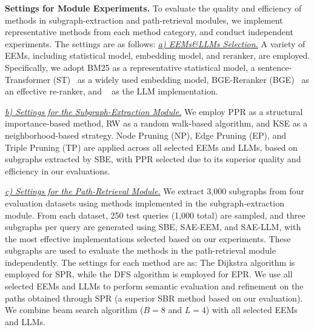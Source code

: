 \textbf{Settings for Module Experiments.}
To evaluate the quality and efficiency of methods in subgraph-extraction and path-retrieval modules, we implement representative methods from each method category, and conduct independent experiments. The settings are as follows:
{\it \underline{a) EEMs\&LLMs Selection.}} A variety of EEMs, including statistical model, embedding model, and reranker, are employed. Specifically, we adopt BM25 as a representative statistical model, a sentence-Transformer (ST)~\cite{MiniLM} as a widely used embedding model, BGE-Reranker (BGE)~\cite{BGE} as an effective re-ranker, and ~\cite{qwen2} as the LLM implementation.

{\it \underline{b) Settings for the Subgraph-Extraction Module.}}
 We employ PPR as a structural importance-based method, RW as a random walk-based algorithm, and KSE as a neighborhood-based strategy.
 Node Pruning (NP), Edge Pruning (EP), and Triple Pruning (TP) are applied across all selected EEMs and LLMs, based on subgraphs extracted by SBE, with PPR selected due to its superior quality and efficiency in our evaluations.

{\it \underline{c) Settings for the Path-Retrieval Module.}}
We extract 3,000 subgraphs from four evaluation datasets using methods implemented in the subgraph-extraction module. From each dataset, 250 test queries (1,000 total) are sampled, and three subgraphs per query are generated using SBE, SAE-EEM, and SAE-LLM, with the most effective implementations selected based on our experiments. These subgraphs are used to evaluate the methods in the path-retrieval module independently. The settings for each method are as:
 The Dijkstra algorithm is employed for SPR, while the DFS algorithm is employed for EPR.
 We use all selected EEMs and LLMs to perform semantic evaluation and refinement on the paths obtained through SPR (a superior SBR method based on our evaluation).
 We combine beam search algorithm (\( B = 8 \) and \( L = 4 \)) with all selected EEMs and LLMs.
